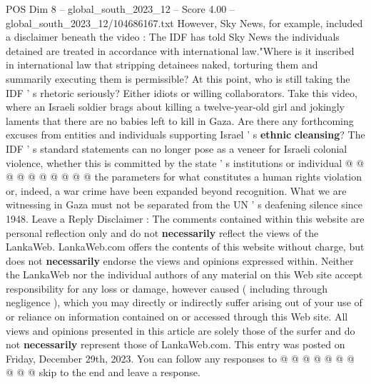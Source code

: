 \begin{textsample}{POS Dim 8 – global\_south\_2023\_12 – Score 4.00 – global\_south\_2023\_12/104686167.txt}
However, Sky News, for example, included a disclaimer beneath the video : The IDF has told Sky News the individuals detained are treated in accordance with international law."Where is it inscribed in international law that stripping detainees naked, torturing them and summarily executing them is permissible?
At this point, who is still taking the IDF ' s rhetoric seriously?
Either idiots or willing collaborators.
Take this video, where an Israeli soldier brags about killing a twelve-year-old girl and jokingly laments that there are no babies left to kill in Gaza.
Are there any forthcoming excuses from entities and individuals supporting Israel ' s \textbf{ethnic} \textbf{cleansing}?
The IDF ' s standard statements can no longer pose as a veneer for Israeli colonial violence, whether this is committed by the state ' s institutions or individual @ @ @ @ @ @ @ @ @ @ the parameters for what constitutes a human rights violation or, indeed, a war crime have been expanded beyond recognition.
What we are witnessing in Gaza must not be separated from the UN ' s deafening silence since 1948.
Leave a Reply Disclaimer : The comments contained within this website are personal reflection only and do not \textbf{necessarily} reflect the views of the LankaWeb.
LankaWeb.com offers the contents of this website without charge, but does not \textbf{necessarily} endorse the views and opinions expressed within.
Neither the LankaWeb nor the individual authors of any material on this Web site accept responsibility for any loss or damage, however caused ( including through negligence ), which you may directly or indirectly suffer arising out of your use of or reliance on information contained on or accessed through this Web site.
All views and opinions presented in this article are solely those of the surfer and do not \textbf{necessarily} represent those of LankaWeb.com.
This entry was posted on Friday, December 29th, 2023.
You can follow any responses to @ @ @ @ @ @ @ @ @ @ skip to the end and leave a response.

\end{textsample}
